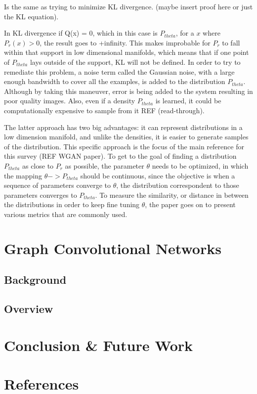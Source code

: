 \documentclass{article}
\begin{document}
Is the same as trying to minimize KL divergence.
(maybe insert proof here or just the KL equation).

In KL divergence if Q(x) = 0, which in this case is $P_{theta}$, for a $x$ where $P_{r}(x) > 0$, the result goes to +infinity. This makes improbable for $P_{r}$ to fall within that support in low dimensional manifolds, which means that if one point of $P_{theta}$ lays outside of the support, KL will not be defined. In order to try to remediate this problem, a noise term called the Gaussian noise, with a large enough bandwidth to cover all the examples, is added to the distribution $P_{theta}$. Although by taking this maneuver, error is being added to the system resulting in poor quality images. Also, even if a density $P_{theta}$ is learned, it could be computationally expensive to sample from it REF (read-through).

The latter approach has two big advantages: it can represent distributions in a low dimension manifold, and unlike the densities, it is easier to generate samples of the distribution. This specific approach is the focus of the main reference for this survey (REF WGAN paper). To get to the goal of finding a distribution  $P_{theta}$ as close to $P_{r}$ as possible, the parameter $\theta$ needs to be optimized, in which the mapping $\theta -> P_{theta}$ should be continuous, since the objective is when a sequence of parameters converge to $\theta$, the distribution correspondent to those parameters converges to $P_{theta}$. To measure the similarity, or distance in between the distributions in order to keep fine tuning $\theta$, the paper goes on to present various metrics that are commonly used. 



\section{Graph Convolutional Networks}
\subsection{Background}
\subsection{Overview}


\section{Conclusion \& Future Work}


\section*{References}
\end{document}
